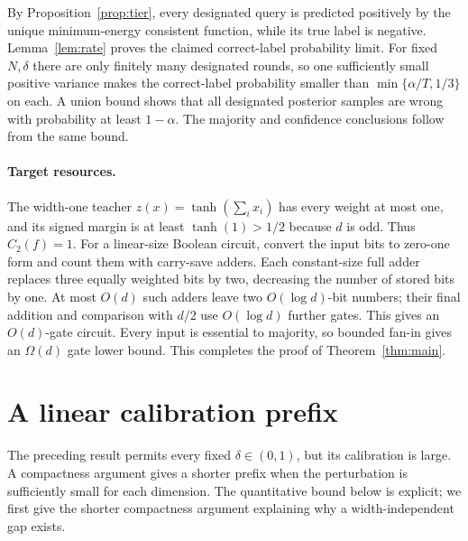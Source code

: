 \documentclass[11pt]{article}
\begin{document}
By Proposition~\ref{prop:tier}, every designated query is predicted
positively by the unique minimum-energy consistent function, while its
true label is negative. Lemma~\ref{lem:rate} proves the claimed
correct-label probability limit. For fixed $N,\delta$ there are only
finitely many designated rounds, so one sufficiently small positive
variance makes the correct-label probability smaller than
$\min\{\alpha/T,1/3\}$ on each. A union bound shows that all designated
posterior samples are wrong with probability at least $1-\alpha$.
The majority and confidence conclusions follow from the same bound.

\paragraph{Target resources.}
The width-one teacher $z(x)=\tanh(\sum_i x_i)$ has every weight at
most one, and its signed margin is at least $\tanh(1)>1/2$ because
$d$ is odd. Thus $C_2(f)=1$. For a linear-size Boolean circuit,
convert the input bits to zero-one form and count them with carry-save
adders. Each constant-size full adder replaces three equally weighted
bits by two, decreasing the number of stored bits by one. At most
$O(d)$ such adders leave two $O(\log d)$-bit numbers; their final
addition and comparison with $d/2$ use $O(\log d)$ further gates.
This gives an $O(d)$-gate circuit. Every input is essential to majority,
so bounded fan-in gives an $\Omega(d)$ gate lower bound. This completes
the proof of Theorem~\ref{thm:main}.

\section{A linear calibration prefix}

The preceding result permits every fixed $\delta\in(0,1)$, but its
calibration is large. A compactness argument gives a shorter prefix
when the perturbation is sufficiently small for each dimension.
The quantitative bound below is explicit; we first give the shorter
compactness argument explaining why a width-independent gap exists.
\end{document}
